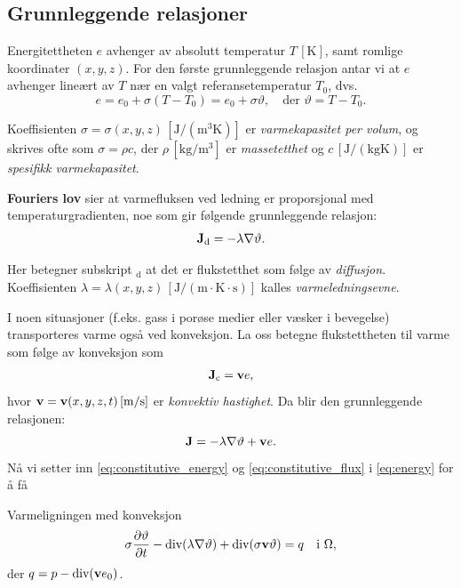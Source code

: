 \subsection*{Grunnleggende relasjoner}
Energitettheten \( e \) avhenger av absolutt temperatur \( T \, [\mathrm{K}] \), samt romlige koordinater $(x,y,z)$. For den første grunnleggende relasjon antar vi at \( e \) avhenger lineært av \( T \) nær en valgt referansetemperatur \( T_0 \), dvs.
\begin{equation}
e = e_0 + \sigma (T - T_0) = e_0 + \sigma \vartheta, \quad \text{der } \vartheta = T - T_0.
\label{eq:constitutive_energy}
\end{equation}
\begin{defn}{}
Koeffisienten \( \sigma = \sigma(x,y,z) \, [\mathrm{J/(m^3 K)}] \) er  \emph{varmekapasitet per volum}, og skrives ofte som \( \sigma = \rho c \), der \( \rho \, [\mathrm{kg/m^3}] \) er \emph{massetetthet} og \( c \, [\mathrm{J/(kg K)}] \) er \emph{spesifikk varmekapasitet}.
\end{defn}
\textbf{Fouriers lov} sier at varmefluksen ved ledning er proporsjonal med temperaturgradienten, noe som gir følgende grunnleggende relasjon:
\[
\mathbf{J}_\textrm{d} = -\lambda \nabla \vartheta.
\]
\begin{defn}{}
Her betegner subskript $_\textrm{d}$ at det er flukstetthet som følge av \textit{diffusjon}. Koeffisienten \( \lambda = \lambda(x,y,z) \, [\mathrm{J/(m \cdot K \cdot s)}] \) kalles \emph{varmeledningsevne}.
\end{defn}
I noen situasjoner (f.eks. gass i porøse medier eller væsker i bevegelse) transporteres varme også ved konveksjon. La oss betegne flukstettheten til varme som følge av konveksjon som
\begin{align}
    \mathbf{J}_\textrm{c}=\mathbf{v}e, 
\end{align}
hvor \(\mathbf{v} = \mathbf{v}(x,y,z,t) \, [\mathrm{m/s}] \) er \emph{konvektiv hastighet}. Da blir den grunnleggende relasjonen:
\begin{equation}
\mathbf{J}= -\lambda \nabla \vartheta + \mathbf{v} e.
\label{eq:constitutive_flux}
\end{equation}
Nå vi setter inn \eqref{eq:constitutive_energy} og \eqref{eq:constitutive_flux} i \eqref{eq:energy} for å få

\begin{oppsum}{Varmeligningen med konveksjon}
\begin{equation}
\sigma \frac{\partial \vartheta}{\partial t} - \text{div} (\lambda \nabla \vartheta) + \text{div}(\sigma \mathbf{v} \vartheta) = q \quad \text{i } \Omega,
\end{equation}
der \( q = p - \text{div} (\mathbf{v} e_0) \).
\end{oppsum}

